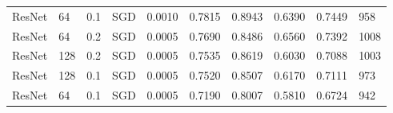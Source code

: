 \begin{landscape}
\begin{table}
\begin{tabular}{l|l|l|l|l|l|l|l|l|l}
    ResNet & 64 & 0.1 & SGD & 0.0010 & 0.7815 & 0.8943 & 0.6390 & 0.7449 & 958 \\
    ResNet & 64 & 0.2 & SGD & 0.0005 & 0.7690 & 0.8486 & 0.6560 & 0.7392 & 1008 \\
    ResNet & 128 & 0.2 & SGD & 0.0005 & 0.7535 & 0.8619 & 0.6030 & 0.7088 & 1003 \\
    ResNet & 128 & 0.1 & SGD & 0.0005 & 0.7520 & 0.8507 & 0.6170 & 0.7111 & 973 \\
    ResNet & 64 & 0.1 & SGD & 0.0005 & 0.7190 & 0.8007 & 0.5810 & 0.6724 & 942
    \end{tabular}
    \label{fig:resnet-results}
\end{table}
\end{landscape}